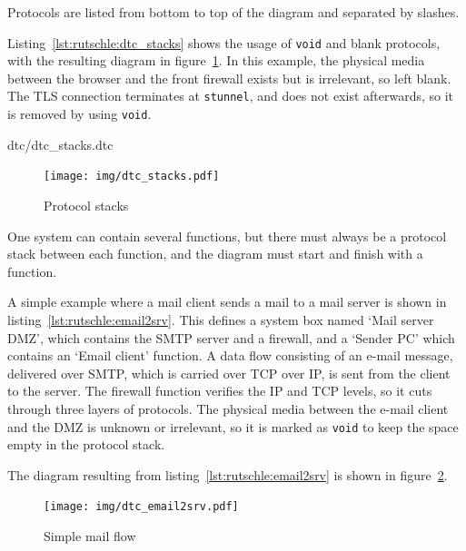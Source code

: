 \documentclass{article}
\begin{document}
\begin{description}
		Protocols are listed from bottom to top of the diagram and
		separated by slashes.

		Listing~\ref{lst:rutschle:dtc_stacks} shows the usage of
		\verb+void+ and blank protocols, with the resulting diagram in
		figure~\ref{fig:rutschle:dtc_stacks}. In this example, the
		physical media between the browser and the front firewall
		exists but is irrelevant, so left blank. The TLS connection
		terminates at \verb+stunnel+, and does not exist afterwards, so
		it is removed by using \verb+void+.

	
			 {dtc/dtc_stacks.dtc}
	\begin{figure}[ht]
		\centering
		\texttt{[image: img/dtc\_stacks.pdf]}
		\caption{Protocol stacks}
		\label{fig:rutschle:dtc_stacks}
	\end{figure}


\end{description}

One system can contain several functions, but there must always be a protocol
stack between each function, and the diagram must start and finish with a function.

A simple example where a mail client sends a mail to a mail server is shown in
listing~\ref{lst:rutschle:email2srv}. This defines a system box named `Mail
server DMZ', which contains the SMTP server and a firewall, and a `Sender PC' which contains an `Email client' function.
A data flow consisting of an e-mail message, delivered over SMTP, which is
carried over TCP over IP, is sent from the client to the server. The firewall function verifies the IP and TCP levels, so it cuts through three layers of protocols. The physical media between the e-mail client and the DMZ is unknown or irrelevant, so it is marked as \verb+void+ to keep the space empty in the protocol stack.






The diagram resulting from listing~\ref{lst:rutschle:email2srv} is shown in figure~\ref{fig:rutschle:email2srv}.

\begin{figure}[ht]
	\centering
	\texttt{[image: img/dtc\_email2srv.pdf]}
	\caption{Simple mail flow}
	\label{fig:rutschle:email2srv}
\end{figure}
\end{document}
